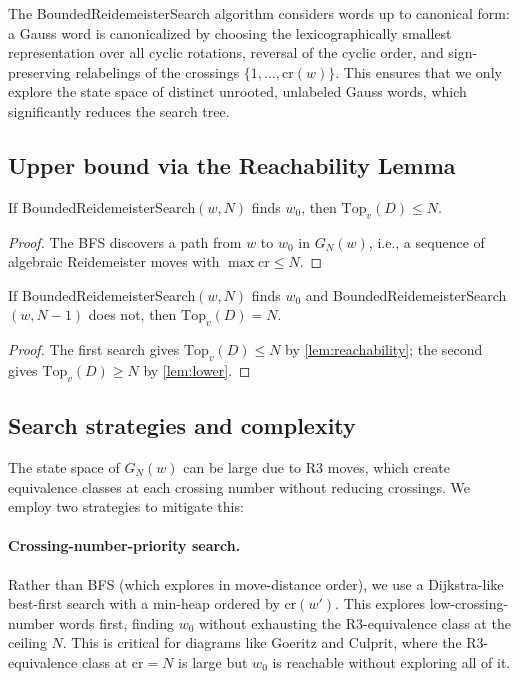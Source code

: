 \documentclass[a4paper,UKenglish,cleveref,autoref]{lipics-v2021}
\newcommand{\BRS}{\textsf{Bounded\-Reide\-meister\-Search}\xspace}
\begin{document}
The \BRS algorithm considers words up to canonical form: a Gauss word is canonicalized by choosing the lexicographically smallest representation over all cyclic rotations, reversal of the cyclic order, and sign-preserving relabelings of the crossings $\{1, \ldots, \mathrm{cr}(w)\}$.
This ensures that we only explore the state space of distinct unrooted, unlabeled Gauss words, which significantly reduces the search tree.

\subsection{Upper bound via the Reachability Lemma}

\begin{lemma}\label{lem:reachability}
If \BRS$(w, N)$ finds $w_0$, then $\mathrm{Top}_v(D) \leq N$.
\end{lemma}

\begin{proof}
The BFS discovers a path from $w$ to $w_0$ in $G_N(w)$, i.e., a sequence of algebraic Reidemeister moves with $\max \mathrm{cr} \leq N$.
\end{proof}

\begin{corollary}\label{cor:exact}
If \BRS$(w, N)$ finds $w_0$ and \BRS$(w, N-1)$ does not, then $\mathrm{Top}_v(D) = N$.
\end{corollary}

\begin{proof}
The first search gives $\mathrm{Top}_v(D) \leq N$ by \cref{lem:reachability}; the second gives $\mathrm{Top}_v(D) \geq N$ by \cref{lem:lower}.
\end{proof}

\subsection{Search strategies and complexity}

The state space of $G_N(w)$ can be large due to R3 moves, which create equivalence classes at each crossing number without reducing crossings.
We employ two strategies to mitigate this:

\paragraph*{Crossing-number-priority search.}
Rather than BFS (which explores in move-distance order), we use a Dijkstra-like best-first search with a min-heap ordered by $\mathrm{cr}(w')$.
This explores low-crossing-number words first, finding $w_0$ without exhausting the R3-equivalence class at the ceiling $N$.
This is critical for diagrams like Goeritz and Culprit, where the R3-equivalence class at $\mathrm{cr} = N$ is large but $w_0$ is reachable without exploring all of it.
\end{document}
